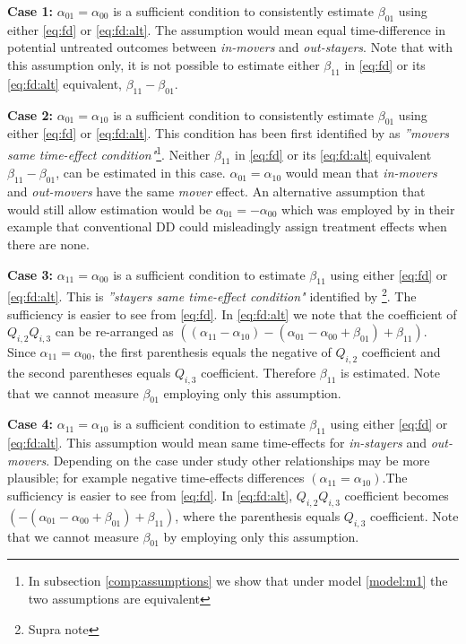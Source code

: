 \documentclass[12pt]{article}
\begin{document}
\textbf{Case 1:} $\alpha_{01} = \alpha_{00}$ is a sufficient condition to consistently estimate $\beta_{01}$ using either \ref{eq:fd} or \ref{eq:fd:alt}. The assumption would mean equal time-difference in potential untreated outcomes between \textit{in-movers} and \textit{out-stayers}. Note that with this assumption only, it is not possible to estimate either $\beta_{11}$ in \ref{eq:fd} or its \ref{eq:fd:alt} equivalent, $\beta_{11}-\beta_{01}$.

\textbf{Case 2:} $\alpha_{01} = \alpha_{10}$ is a sufficient condition to consistently estimate $\beta_{01}$ using either \ref{eq:fd} or \ref{eq:fd:alt}. This condition has been first identified by \cite{lee2013difference} as \textit{''movers same time-effect condition"}\footnote{In subsection \vref{comp:assumptions} we show that under model \ref{model:m1} the two assumptions are equivalent}. Neither $\beta_{11}$ in \ref{eq:fd} or its \ref{eq:fd:alt} equivalent $\beta_{11}-\beta_{01}$, can be estimated in this case. $\alpha_{01} = \alpha_{10}$ would mean that \textit{in-movers} and \textit{out-movers} have the same \textit{mover} effect. An alternative assumption that would still allow estimation would be $\alpha_{01} = -\alpha_{00}$ which was employed by \cite{lee2013difference} in their example that conventional DD could misleadingly assign treatment effects when there are none.

\textbf{Case 3:} $\alpha_{11} = \alpha_{00}$ is a sufficient condition to estimate $\beta_{11}$ using either \ref{eq:fd} or \ref{eq:fd:alt}. This is \textit{''stayers same time-effect condition"} identified by \cite{lee2014difference}\footnote{Supra note}. The sufficiency is easier to see from \ref{eq:fd}. In \ref{eq:fd:alt} we note that the coefficient of $Q_{i,2}Q_{i,3}$ can be re-arranged as $((\alpha_{11}-\alpha_{10})-(\alpha_{01} -\alpha_{00} +\beta_{01})+ \beta_{11})$. Since $\alpha_{11} = \alpha_{00}$, the first parenthesis equals the negative of $Q_{i,2}$ coefficient and the second parentheses equals $Q_{i,3}$ coefficient. Therefore $\beta_{11}$ is estimated. Note that we cannot measure $\beta_{01}$ employing only this assumption.

\textbf{Case 4:} $\alpha_{11} = \alpha_{10}$ is a sufficient condition to estimate $\beta_{11}$ using either \ref{eq:fd} or \ref{eq:fd:alt}. This assumption would mean same time-effects for \textit{in-stayers} and \textit{out-movers}. Depending on the case under study other relationships may be more plausible; for example negative time-effects differences $(\alpha_{11} = \alpha_{10})$.The sufficiency is easier to see from \ref{eq:fd}. In \ref{eq:fd:alt}, $Q_{i,2}Q_{i,3}$ coefficient becomes $(-(\alpha_{01} -\alpha_{00} +\beta_{01})+ \beta_{11})$, where the parenthesis equals $Q_{i,3}$ coefficient. Note that we cannot measure $\beta_{01}$ by employing only this assumption.
\end{document}
